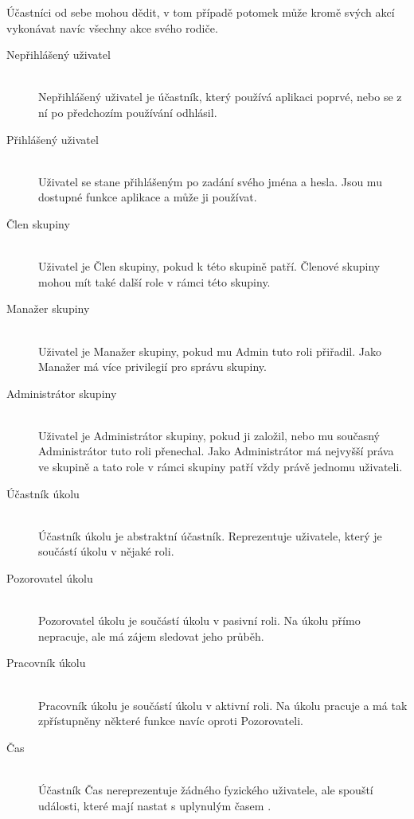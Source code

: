 \documentclass[thesis=B,czech]{FITthesis}[2012/06/26]
\begin{document}
			Účastníci od sebe mohou dědit, v tom případě potomek může kromě svých akcí vykonávat navíc všechny akce svého rodiče.
			\begin{description}
				\item[Nepřihlášený uživatel] \hfill \\ 
					Nepřihlášený uživatel je účastník, který používá aplikaci poprvé, nebo se z ní po předchozím používání odhlásil.
					
				\item[Přihlášený uživatel] \hfill \\ 
					Uživatel se stane přihlášeným po zadání svého jména a hesla. Jsou mu dostupné funkce aplikace a může ji používat.
				
				\item[Člen skupiny] \hfill \\ 
					Uživatel je Člen skupiny, pokud k této skupině patří. Členové skupiny mohou mít také další role v rámci této skupiny.
				
				\item[Manažer skupiny] \hfill \\ 
					Uživatel je Manažer skupiny, pokud mu Admin tuto roli přiřadil. Jako Manažer má více privilegií pro správu skupiny.
				
				\item[Administrátor skupiny] \hfill \\ 
					Uživatel je Administrátor skupiny, pokud ji založil, nebo mu současný Administrátor tuto roli přenechal. Jako Administrátor má nejvyšší práva ve skupině a tato role v rámci skupiny patří vždy právě jednomu uživateli.
					
				\item[Účastník úkolu] \hfill \\
					Účastník úkolu je abstraktní účastník. Reprezentuje uživatele, který je součástí úkolu v nějaké roli.
				
				\item[Pozorovatel úkolu] \hfill \\ 
					Pozorovatel úkolu je součástí úkolu v pasivní roli. Na úkolu přímo nepracuje, ale má zájem sledovat jeho průběh.
				
				\item[Pracovník úkolu] \hfill \\ 
					Pracovník úkolu je součástí úkolu v aktivní roli. Na úkolu pracuje a má tak zpřístupněny některé funkce navíc oproti Pozorovateli.
				
				\item[Čas] \hfill \\ 								
					Účastník Čas nereprezentuje žádného fyzického uživatele, ale spouští události, které mají nastat s uplynulým časem \cite{uml-unified-process}.
					

			\end{description}			
\end{document}
